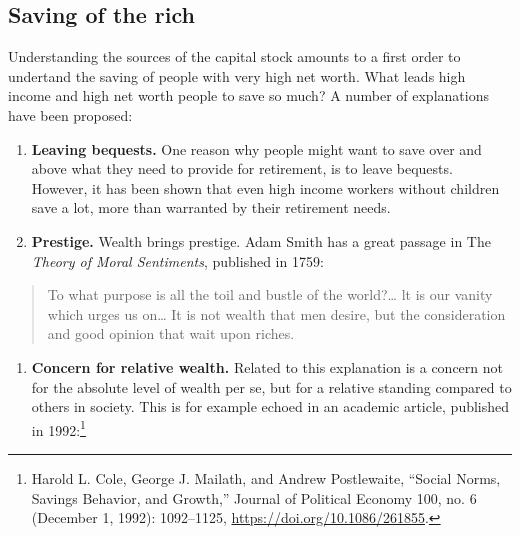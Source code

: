 \documentclass[]{book}
\providecommand{\tightlist}{%
  \setlength{\itemsep}{0pt}\setlength{\parskip}{0pt}}
\let\rmarkdownfootnote\footnote%
\def\footnote{\protect\rmarkdownfootnote}
\begin{document}
\subsection{Saving of the rich}\label{saving-of-the-rich}

Understanding the sources of the capital stock amounts to a first order
to undertand the saving of people with very high net worth. What leads
high income and high net worth people to save so much? A number of
explanations have been proposed:

\begin{enumerate}
\def\labelenumi{\arabic{enumi}.}
\item
  \textbf{Leaving bequests.} One reason why people might want to save
  over and above what they need to provide for retirement, is to leave
  bequests. However, it has been shown that even high income workers
  without children save a lot, more than warranted by their retirement
  needs.
\item
  \textbf{Prestige.} Wealth brings prestige. Adam Smith has a great
  passage in The \emph{Theory of Moral Sentiments}, published in 1759:
\end{enumerate}

\begin{quote}
To what purpose is all the toil and bustle of the world?\ldots{} lt is
our vanity which urges us on\ldots{} It is not wealth that men desire,
but the consideration and good opinion that wait upon riches.
\end{quote}

\begin{enumerate}
\def\labelenumi{\arabic{enumi}.}
\setcounter{enumi}{2}
\tightlist
\item
  \textbf{Concern for relative wealth.} Related to this explanation is a
  concern not for the absolute level of wealth per se, but for a
  relative standing compared to others in society. This is for example
  echoed in an academic article, published in 1992:\footnote{Harold L.
    Cole, George J. Mailath, and Andrew Postlewaite, ``Social Norms,
    Savings Behavior, and Growth,'' Journal of Political Economy 100,
    no. 6 (December 1, 1992): 1092--1125,
    \url{https://doi.org/10.1086/261855}.}
\end{enumerate}
\end{document}
